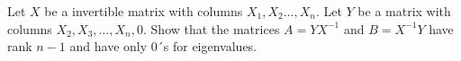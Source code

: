 Let \(X\) be a invertible matrix with columns \(X_{1},X_{2}\dots,X_{n}\). Let \(Y\) be a matrix with columns \(X_{2},X_{3},\dots,X_{n},0\). Show that the matrices \(A=YX^{-1}\) and \(B=X^{-1}Y\) have rank \(n-1\) and have only \(0\)´s for eigenvalues.